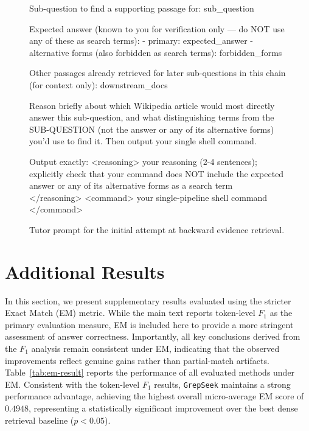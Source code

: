 \documentclass{article} %
\newcommand{\ourmethod}{\texttt{GrepSeek}\xspace}
\begin{document}
\begin{figure}[!t]
\begin{promptbox}
Sub-question to find a supporting passage for: {sub_question}

Expected answer (known to you for verification only — do NOT use any of these as search terms):
- primary: {expected_answer}
- alternative forms (also forbidden as search terms): {forbidden_forms}

Other passages already retrieved for later sub-questions in this chain (for context only):
{downstream_docs}

Reason briefly about which Wikipedia article would most directly answer this sub-question, and what distinguishing terms from the SUB-QUESTION (not the answer or any of its alternative forms) you'd use to find it. Then output your single shell command.

Output exactly:
<reasoning>
your reasoning (2-4 sentences); explicitly check that your command does NOT include the expected answer or any of its alternative forms as a search term
</reasoning>
<command>
your single-pipeline shell command
</command>
\end{promptbox}
\vspace{-0.4cm}
\caption{Tutor prompt for the initial attempt at backward evidence retrieval.}
\label{fig:prompt_backward_first}
\end{figure}

\newpage

\section{Additional Results}
\label{app:more-results}

In this section, we present supplementary results evaluated using the stricter Exact Match (EM) metric. While the main text reports token-level $F_1$ as the primary evaluation measure, EM is included here to provide a more stringent assessment of answer correctness. Importantly, all key conclusions derived from the $F_1$ analysis remain consistent under EM, indicating that the observed improvements reflect genuine gains rather than partial-match artifacts. Table~\ref{tab:em-result} reports the performance of all evaluated methods under EM. Consistent with the token-level $F_1$ results, \ourmethod{} maintains a strong performance advantage, achieving the highest overall micro-average EM score of $0.4948$, representing a statistically significant improvement over the best dense retrieval baseline ($p < 0.05$).
\end{document}
